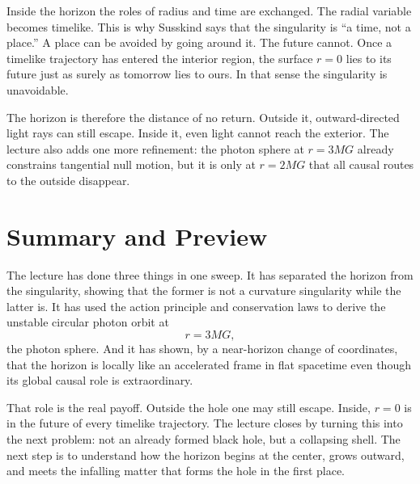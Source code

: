 Inside the horizon the roles of radius and time are exchanged. The radial variable becomes timelike. This is why Susskind says that the singularity is ``a time, not a place.'' A place can be avoided by going around it. The future cannot. Once a timelike trajectory has entered the interior region, the surface \(r=0\) lies to its future just as surely as tomorrow lies to ours. In that sense the singularity is unavoidable.

The horizon is therefore the distance of no return. Outside it, outward-directed light rays can still escape. Inside it, even light cannot reach the exterior. The lecture also adds one more refinement: the photon sphere at \(r=3MG\) already constrains tangential null motion, but it is only at \(r=2MG\) that all causal routes to the outside disappear.

\section{Summary and Preview}

The lecture has done three things in one sweep. It has separated the horizon from the singularity, showing that the former is not a curvature singularity while the latter is. It has used the action principle and conservation laws to derive the unstable circular photon orbit at
\begin{equation}
r=3MG,
\end{equation}
the photon sphere. And it has shown, by a near-horizon change of coordinates, that the horizon is locally like an accelerated frame in flat spacetime even though its global causal role is extraordinary.

That role is the real payoff. Outside the hole one may still escape. Inside, \(r=0\) is in the future of every timelike trajectory. The lecture closes by turning this into the next problem: not an already formed black hole, but a collapsing shell. The next step is to understand how the horizon begins at the center, grows outward, and meets the infalling matter that forms the hole in the first place.